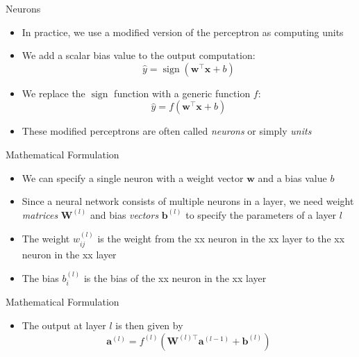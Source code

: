 \documentclass{beamer}
\DeclareMathOperator{\sign}{sign}
\begin{document}
	\begin{frame}{Neurons}
		\begin{itemize}
			\item <1-> In practice, we use a modified version of the perceptron as computing units
			\item <2-> We add a scalar bias value to the output computation:
			\begin{equation}
				\hat{y} = \sign\left (\bm{w}^\top\bm{x} + b\right )
			\end{equation}
			\item <3-> We replace the $\sign$ function with a generic function $f$:
			\begin{equation}
				\hat{y} = f\left (\bm{w}^\top\bm{x} + b\right )
			\end{equation}
			\item <4> These modified perceptrons are often called \emph{neurons} or simply \emph{units}
		\end{itemize}
	\end{frame}
	
	\begin{frame}{Mathematical Formulation}
		\begin{itemize}
			\item <1-> We can specify a single neuron with a weight vector $\bm{w}$ and a bias value $b$
			\item <2-> Since a neural network consists of multiple neurons in a layer, we need weight \emph{matrices} $\bm{W}^{(l)}$ and bias \emph{vectors} $\bm{b}^{(l)}$ to specify the parameters of a layer $l$
			\item <3-> The weight $w_{ij}^{(l)}$  is the weight from the xx neuron in the xx layer to the xx neuron in the xx layer
			\item <4-> The bias $b_i^{(l)}$ is the bias of the xx neuron in the xx layer
		\end{itemize}
	\end{frame}
	
	\begin{frame}{Mathematical Formulation}
		\begin{itemize}
			\item <1-> The output at layer $l$ is then given by
			\begin{equation}
				\bm{a}^{(l)} = f^{(l)}\left(\bm{W}^{(l)\top}\bm{a}^{(l-1)}+\bm{b}^{(l)}\right)
			\end{equation}
		\end{itemize}
	\end{frame}
	
\end{document}

